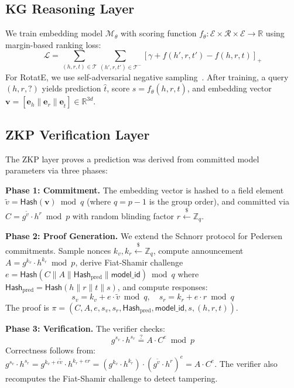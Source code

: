 \documentclass[runningheads]{llncs}
\newcommand{\R}{\mathbb{R}}
\newcommand{\Z}{\mathbb{Z}}
\newcommand{\Hash}{\mathsf{Hash}}
\newcommand{\embed}{\mathbf{e}}
\newcommand{\vect}[1]{\mathbf{#1}}
\begin{document}
\subsection{KG Reasoning Layer}

We train embedding model $\mathcal{M}_\theta$ with scoring function $f_\theta: \mathcal{E} \times \mathcal{R} \times \mathcal{E} \to \R$ using margin-based ranking loss:
\begin{equation}
    \mathcal{L} = \sum_{(h,r,t) \in \mathcal{T}} \sum_{(h',r,t') \in \mathcal{T}^-} \left[\gamma + f(h', r, t') - f(h, r, t)\right]_+
\end{equation}
For RotatE, we use self-adversarial negative sampling~\cite{sun2019rotate}. After training, a query $(h, r, ?)$ yields prediction $\hat{t}$, score $s = f_\theta(h, r, \hat{t})$, and embedding vector $\vect{v} = [\embed_h \| \embed_r \| \embed_{\hat{t}}] \in \R^{3d}$.

\subsection{ZKP Verification Layer}

The ZKP layer proves a prediction was derived from committed model parameters via three phases:

\textbf{Phase 1: Commitment.} The embedding vector is hashed to a field element $\tilde{v} = \Hash(\vect{v}) \bmod q$ (where $q = p-1$ is the group order), and committed via $C = g^{\tilde{v}} \cdot h^r \bmod p$ with random blinding factor $r \xleftarrow{\$} \Z_q$.

\textbf{Phase 2: Proof Generation.} We extend the Schnorr protocol for Pedersen commitments. Sample nonces $k_v, k_r \xleftarrow{\$} \Z_q$, compute announcement $A = g^{k_v} \cdot h^{k_r} \bmod p$, derive Fiat-Shamir challenge $e = \Hash(C \| A \| \Hash_{\text{pred}} \| \mathsf{model\_id}) \bmod q$ where $\Hash_{\text{pred}} = \Hash(h \| r \| t \| s)$, and compute responses:
\begin{equation}
    s_v = k_v + e \cdot \tilde{v} \bmod q, \quad s_r = k_r + e \cdot r \bmod q
\end{equation}
The proof is $\pi = (C, A, e, s_v, s_r, \Hash_{\text{pred}}, \mathsf{model\_id}, s, (h,r,t))$.

\textbf{Phase 3: Verification.} The verifier checks:
\begin{equation}
    g^{s_v} \cdot h^{s_r} \stackrel{?}{=} A \cdot C^e \bmod p
    \label{eq:verify}
\end{equation}
Correctness follows from: $g^{s_v} \cdot h^{s_r} = g^{k_v + e\tilde{v}} \cdot h^{k_r + er} = (g^{k_v} \cdot h^{k_r}) \cdot (g^{\tilde{v}} \cdot h^r)^e = A \cdot C^e$. The verifier also recomputes the Fiat-Shamir challenge to detect tampering.
\end{document}
